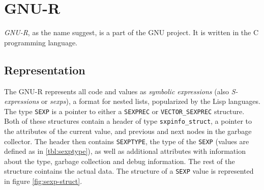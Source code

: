 %
%
%

\newpage
\section{GNU-R}

\textit{GNU-R}, as the name suggest, is a part of the GNU project. It is written in the C programming language. 


\subsection*{Representation}

The GNU-R represents all code and values as \textit{symbolic expressions} (also \textit{S-expressions} or \textit{sexps}), a format for nested lists, popularized by the Lisp languages. The type \texttt{SEXP} is a pointer to either a \texttt{SEXPREC} or \texttt{VECTOR\_SEXPREC} structure. Both of these structures contain a header of type \texttt{sxpinfo\_struct}, a pointer to the attributes of the current value, and previous and next nodes in the garbage collector. The header then contains \texttt{SEXPTYPE}, the type of the \texttt{SEXP} (values are defined as in \ref{tbl:sexptype}), as well as additional attributes with information about the type, garbage collection and debug information. The rest of the structure cointains the actual data. The structure of a \texttt{SEXP} value is represented in figure \ref{fig:sexp-struct}.


